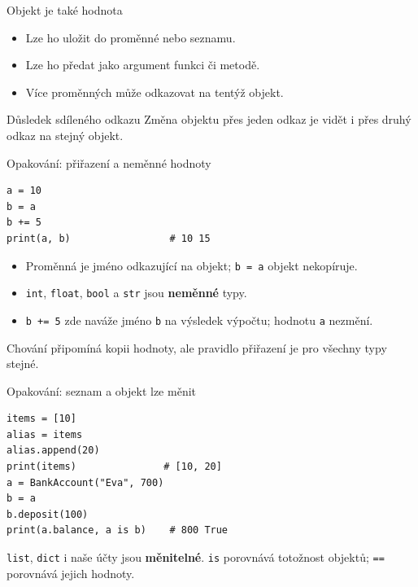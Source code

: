 \documentclass[aspectratio=169]{beamer}
\newcommand{\term}[1]{\textcolor{CodeBlue}{\textbf{#1}}}
\begin{document}
\begin{frame}{Objekt je také hodnota}
  \begin{itemize}
    \item Lze ho uložit do proměnné nebo seznamu.
    \item Lze ho předat jako argument funkci či metodě.
    \item Více proměnných může odkazovat na tentýž objekt.
  \end{itemize}
  \begin{alertblock}{Důsledek sdíleného odkazu}
    Změna objektu přes jeden odkaz je vidět i přes druhý odkaz na stejný objekt.
  \end{alertblock}
\end{frame}

\begin{frame}[fragile]{Opakování: přiřazení a neměnné hodnoty}
\begin{lstlisting}[style=python,basicstyle=\ttfamily\normalsize]
a = 10
b = a
b += 5
print(a, b)                 # 10 15
\end{lstlisting}
  \begin{itemize}
    \item Proměnná je jméno odkazující na objekt; \texttt{b = a} objekt nekopíruje.
    \item \texttt{int}, \texttt{float}, \texttt{bool} a \texttt{str} jsou \term{neměnné} typy.
    \item \texttt{b += 5} zde naváže jméno \texttt{b} na výsledek výpočtu; hodnotu \texttt{a} nezmění.
  \end{itemize}
  Chování připomíná kopii hodnoty, ale pravidlo přiřazení je pro všechny typy stejné.
\end{frame}

\begin{frame}[fragile]{Opakování: seznam a objekt lze měnit}
\begin{lstlisting}[style=python,basicstyle=\ttfamily\normalsize]
items = [10]
alias = items
alias.append(20)
print(items)               # [10, 20]
a = BankAccount("Eva", 700)
b = a
b.deposit(100)
print(a.balance, a is b)    # 800 True
\end{lstlisting}
  \texttt{list}, \texttt{dict} i naše účty jsou \term{měnitelné}.
  \texttt{is} porovnává totožnost objektů; \texttt{==} porovnává jejich hodnoty.
\end{frame}
\end{document}
